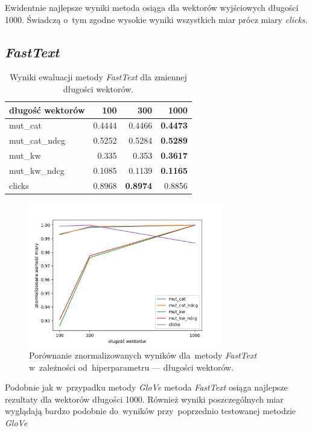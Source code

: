 \documentclass[pl]{minipw} %
\begin{document}
Ewidentnie najlepsze wyniki metoda osiąga dla wektorów wyjściowych długości 1000. Świadczą o~tym zgodne wysokie wyniki wszystkich miar prócz miary \textit{clicks}.

\subsection{\textit{FastText}}

\begin{table}[H]
	\centering
	\begin{tabular}{lrrr}
		\hline
		długość wektorów &      100 &      300 &     1000 \\
		\hline
		mut\_cat      & 0.4444 & 0.4466 & \textbf{0.4473} \\
		mut\_cat\_ndcg & 0.5252 & 0.5284 & \textbf{0.5289} \\
		mut\_kw       & 0.335  & 0.353  & \textbf{0.3617} \\
		mut\_kw\_ndcg  & 0.1085 & 0.1139 & \textbf{0.1165} \\
		clicks       & 0.8968 & \textbf{0.8974} & 0.8856 \\
		\hline
	\end{tabular}
	\caption{Wyniki ewaluacji metody \textit{FastText} dla zmiennej długości wektorów.}
\end{table}

\begin{figure}[H]
	\centering
	\includegraphics[width=0.75\textwidth]{img/results/ft_ctr.png}
	\caption{Porównanie znormalizowanych wyników dla~metody \textit{FastText} w~zależności od~hiperparametru --- długości wektorów.}
\end{figure}

Podobnie jak w~przypadku metody \textit{GloVe} metoda \textit{FastText} osiąga najlepsze rezultaty dla wektorów długości 1000. Również wyniki poszczególnych miar wyglądają bardzo podobnie do~wyników przy~poprzednio testowanej metodzie \textit{GloVe}
\end{document}
